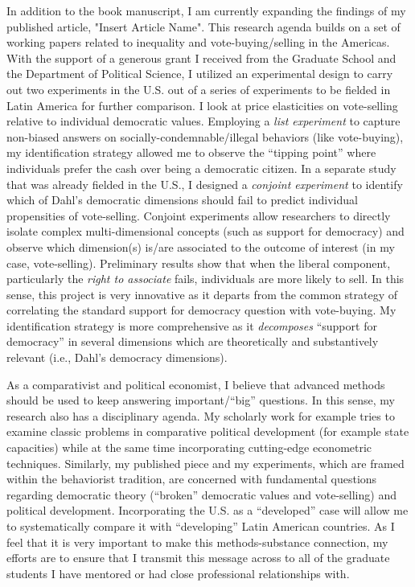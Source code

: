 \documentclass[10pt,stdletter,dateno,sigleft]{newlfm} %
\begin{document}
\begin{newlfm}
In addition to the book manuscript, I am currently expanding the findings of my published article, "Insert Article Name". This research agenda builds on a set of working papers related to inequality and vote-buying/selling in the Americas. With the support of a generous grant I received from the Graduate School and the Department of Political Science, I utilized an experimental design to carry out two experiments in the U.S. out of a series of experiments to be fielded in Latin America for further comparison. I look at price elasticities on vote-selling relative to individual democratic values. Employing a \emph{list experiment} to capture non-biased answers on socially-condemnable/illegal behaviors (like vote-buying), my identification strategy allowed me to observe the ``tipping point'' where individuals prefer the cash over being a democratic citizen. In a separate study that was already fielded in the U.S., I designed a \emph{conjoint experiment} to identify which of Dahl's democratic dimensions should fail to predict individual propensities of vote-selling. Conjoint experiments allow researchers to directly isolate complex multi-dimensional concepts (such as support for democracy) and observe which dimension(s) is/are associated to the outcome of interest (in my case, vote-selling). Preliminary results show that when the liberal component, particularly the \emph{right to associate} fails, individuals are more likely to sell. In this sense, this project is very innovative as it departs from the common strategy of correlating the standard support for democracy question with vote-buying. My identification strategy is more comprehensive as it \emph{decomposes} ``support for democracy'' in several dimensions which are theoretically and substantively relevant (i.e., Dahl's democracy dimensions). 


As a comparativist and political economist, I believe that advanced methods should be used to keep answering important/``big'' questions. In this sense, my research also has a disciplinary agenda. My scholarly work for example tries to examine classic problems in comparative political development (for example state capacities) while at the same time incorporating cutting-edge econometric techniques. Similarly, my published piece and my experiments, which are framed within the behaviorist tradition, are concerned with fundamental questions regarding democratic theory (``broken'' democratic values and vote-selling) and political development. Incorporating the U.S. as a ``developed'' case will allow me to systematically compare it with ``developing'' Latin American countries. As I feel that it is very important to make this methods-substance connection, my efforts are to ensure that I transmit this message across to all of the graduate students I have mentored or had close professional relationships with. 



\end{newlfm}
\end{document}
